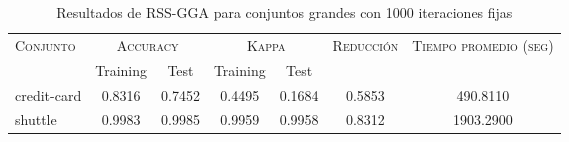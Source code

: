 \begin{table}[]
\centering
\begin{tabular}{l c c c c c c}
\hline
\multirow{2}{*}{\textsc{Conjunto}}
	& \multicolumn{2}{c}{\textsc{Accuracy}}
	& \multicolumn{2}{c}{\textsc{Kappa}}
	& \textsc{Reducción}
	& \textsc{Tiempo promedio (seg)} \\
	& Training & Test
	& Training & Test \\ 
\hline
\hline

credit-card & 0.8316 & 0.7452 & 0.4495 & 0.1684 & 0.5853 & 490.8110 \\
shuttle & 0.9983 & 0.9985 & 0.9959 & 0.9958 & 0.8312 & 1903.2900 \\

\hline
\end{tabular}
\caption{Resultados de RSS-GGA para conjuntos grandes con 1000 iteraciones fijas}
\label{res-grande-rss-gga}
\end{table}

